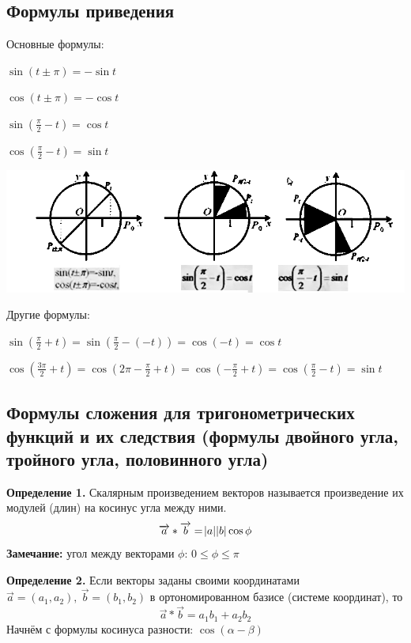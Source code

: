 \documentclass{article}
\begin{document}
        \subsection{Формулы приведения}
        
        Основные формулы:
        
        \(\sin{(t \pm \pi)} = -\sin{t}\)
        
        \(\cos{(t \pm \pi)} = -\cos{t}\)
        
        \(\sin{(\frac{\pi}{2} - t)} = \cos{t}\)
        
        \(\cos{(\frac{\pi}{2} - t)} = \sin{t}\)
        
        \begin{center}
            \includegraphics[scale=0.42]{3}
        \end{center}

        Другие формулы:
        
        \(\sin{(\frac{\pi}{2} + t)} = \sin{(\frac{\pi}{2} - (-t))} = \cos{(-t)} = \cos{t}\)
        
        \(\cos{(\frac{3 \pi}{2} + t)} = \cos{(2 \pi - \frac{\pi}{2} + t)} = \cos{(-\frac{\pi}{2} + t)} = \cos{(\frac{\pi}{2} - t)} = \sin{t}\)
        
        \subsection{Формулы сложения для тригонометрических функций и их следствия (формулы двойного угла, тройного угла, половинного угла)}
        
        \textbf{Определение 1.} Скалярным произведением векторов называется произведение их модулей (длин) на косинус угла между ними.
        \[\overrightarrow{a}*\overrightarrow{b} = \abs{a}\abs{b}\cos{\phi}\]
        \textbf{Замечание:} угол между векторами \(\phi\): \(0 \leq \phi \leq \pi\)
        
        \textbf{Определение 2.} Если векторы заданы своими координатами \(\overrightarrow{a} = (a_1, a_2),\ \overrightarrow{b} = (b_1, b_2)\) в ортономированном базисе (системе координат), то
        \[\overrightarrow{a}*\overrightarrow{b} = a_1 b_1 + a_2 b_2\]
        Начнём с формулы косинуса разности: \(\cos{(\alpha - \beta)}\)
        
\end{document}
